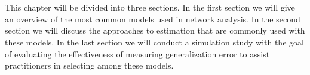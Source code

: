 \documentclass[fleqn,12pt]{wlscirep}
\begin{document}
\\~\\
 This chapter will be divided into three sections. In the first section we will give an overview of the most common models used in network analysis. In the second section we will discuss the approaches to estimation that are commonly used with these models. In the last section we will conduct a simulation study with the goal of evaluating the effectiveness of measuring generalization error to assist practitioners in selecting among these models.






\end{document}
